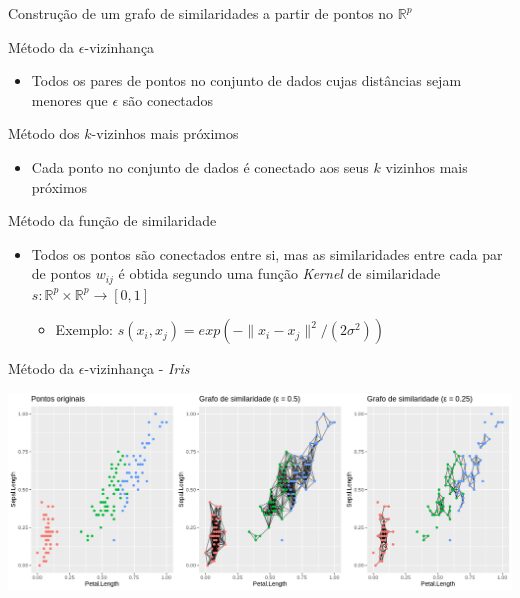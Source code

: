 \documentclass[11pt]{beamer}
\newcommand{\R}{\mathbb{R}}
\begin{document}
\begin{frame}{Construção de um grafo de similaridades a partir de pontos no $\R^p$}


Método da $\epsilon$-vizinhança

\begin{itemize}

\item Todos os pares de pontos no conjunto de dados cujas distâncias sejam menores que $\epsilon$ são conectados

\end{itemize}

Método dos $k$-vizinhos mais próximos

\begin{itemize}

\item Cada ponto no conjunto de dados é conectado aos seus $k$ vizinhos mais próximos

\end{itemize}

Método da função de similaridade

\begin{itemize}

\item Todos os pontos são conectados entre si, mas as similaridades entre cada par de pontos $w_{ij}$ é obtida segundo uma função \textit{Kernel} de similaridade $s: \R^p \times \R^p \rightarrow [0,1] $

\begin{itemize}
\item Exemplo: $ s(x_i, x_j) = exp(-\parallel x_i - x_j\parallel^2/(2\sigma^2))$
\end{itemize}

\end{itemize}


\end{frame}


\begin{frame}{Método da $\epsilon$-vizinhança - \textit{Iris}}

\vspace{0.3cm}

\includegraphics[scale=0.37]{epsilon_similarity}

\end{frame}
\end{document}
